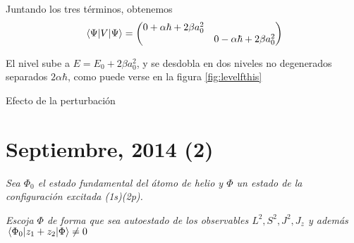 Juntando los tres términos,
obtenemos
\begin{equation}
  \mel{\Psi}{V}{\Psi} =
  \begin{pmatrix}
    0+\alpha \hbar +2\beta a_0^2 & \\
    & 0-\alpha \hbar +2\beta a_0^2  \\
  \end{pmatrix}
\end{equation}

El nivel sube a $E = E_0 +2\beta a_0^2$, y se desdobla en dos niveles
no degenerados separados $2\alpha \hbar$, como puede verse en la
figura \ref{fig:levelfthis}
\begin{marginfigure}
  \caption{Efecto de la perturbación}
  \label{fig:levelfthis}
\end{marginfigure}

\chapter{Septiembre, 2014 (2)}
\begin{tcolorbox}[halign=left]
  \emph{Sea $\Phi_0$ el estado fundamental del átomo de helio y $\Phi$
  un estado de la configuración excitada (1s)(2p).}

\emph{Escoja $\Phi$ de forma que sea autoestado de los observables
  $L^2,S^2,J^2,J_z$ y además $\mel{\Phi_0}{z_1+z_2}{\Phi}\neq 0$}
\end{tcolorbox}

